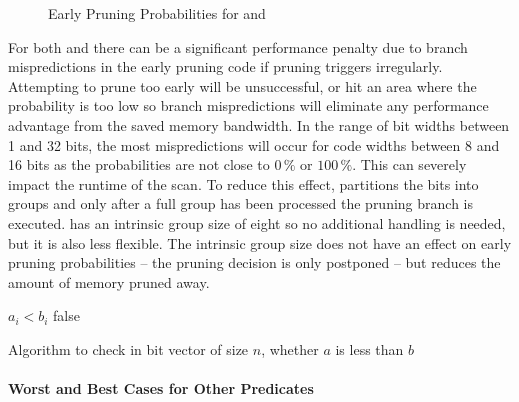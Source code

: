 \begin{figure}[h] \center
{}
\caption{Early Pruning Probabilities for \bwv{} and \bs{}}
\label{fig:earlypruningprobabilities}
\end{figure}

For both \bwv{} and \bs{} there can be a significant performance penalty due to
branch mispredictions in the early pruning code if pruning triggers irregularly.
Attempting to prune too early will be unsuccessful, or hit an area where the
probability is too low so branch mispredictions will eliminate any performance
advantage from the saved memory bandwidth.  In the range of bit widths between 1
and 32 bits, the most mispredictions will occur for code widths between 8 and 16
bits as the probabilities are not close to $0\,\%$ or $100\,\%$. This can
severely impact the runtime of the scan. To reduce this effect, \bwv{}
partitions the bits into groups and only after a full group has been processed
the pruning branch is executed. \bs{} has an intrinsic group size of eight so no
additional handling is needed, but it is also less flexible. The intrinsic group
size does not have an effect on early pruning probabilities -- the pruning
decision is only postponed -- but reduces the amount of memory pruned away.

\begin{algorithm}[hb]
\begin{algorithmic}[1]
        \State \Return $a_i < b_i$
      \EndIf
    \EndFor
    \State \Return false
  \EndProcedure
\end{algorithmic}
\caption{Algorithm to check in bit vector of size $n$, whether $a$ is less than $b$}
\label{algo:less}
\end{algorithm}

\paragraph{Worst and Best Cases for Other Predicates}

